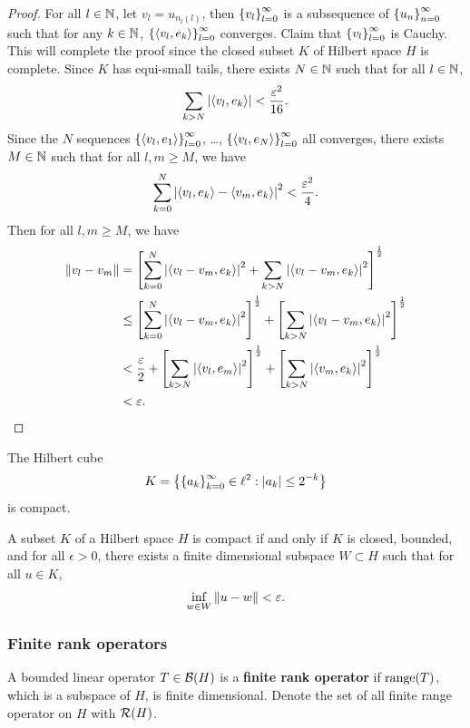 \documentclass[a4paper]{article}
\begin{document}
\begin{proof}
For all $l \in \mathbb{N}$, let $v_l = u_{n_l(l)}$, then 
$\left\{ v_l \right\}_{l=0}^\infty$ is a subsequence of $\left\{ u_n \right\}_{n=0}^\infty$
such that for any $k \in \mathbb{N}$, 
$\left\{ \left\langle v_l, e_k \right\rangle \right\}_{l=0}^\infty$ converges. Claim that 
$\left\{ v_l \right\}_{l=0}^\infty$ is Cauchy. This will complete the proof 
since the closed subset $K$ of Hilbert space $H$ is complete.
Since $K$ has equi-small tails, there exists $N \in \mathbb{N}$
such that for all $l \in \mathbb{N}$, 
\[
\sum_{k > N} \left\lvert \left\langle v_l, e_k \right\rangle\right\rvert < \frac{\varepsilon^2}{16}.
\]
Since the $N$ sequences $\left\{ \left\langle v_l, e_1 \right\rangle \right\}_{l=0}^\infty$, 
\dots, $\left\{ \left\langle v_l, e_N \right\rangle \right\}_{l=0}^\infty$ all converges, 
there exists $M \in \mathbb{N}$ such that for all $l, m \geq M$, 
we have 
\[
\sum_{k=0}^N \left\lvert \left\langle v_l, e_k \right\rangle - \left\langle v_m, e_k \right\rangle\right\rvert^2 
< \frac{\varepsilon^2}{4}.
\]
Then for all $l, m \geq M$, we have 
\[
\begin{aligned}
  \left\lVert v_l - v_m\right\rVert 
  &= 
  \left[ \sum_{k=0}^N \left\lvert \left\langle v_l - v_m, e_k \right\rangle\right\rvert^2 
  + \sum_{k > N} \left\lvert \left\langle v_l - v_m, e_k \right\rangle\right\rvert^2 \right]^{\frac{1}{2}} \\
  &\leq
  \left[ \sum_{k=0}^N \left\lvert \left\langle v_l - v_m, e_k \right\rangle\right\rvert^2  \right]
  ^{\frac{1}{2}}
  + \left[ \sum_{k > N} \left\lvert \left\langle v_l - v_m, e_k \right\rangle\right\rvert^2 \right]
  ^{\frac{1}{2}} \\ 
  &< \frac{\varepsilon}{2} + \left[ \sum_{k > N} \left\lvert \left\langle v_l, e_m \right\rangle\right\rvert^2 \right]
  ^{\frac{1}{2}} + \left[ \sum_{k > N} \left\lvert \left\langle v_m, e_k \right\rangle\right\rvert^2 \right]
  ^{\frac{1}{2}} \\
  &< \varepsilon. 
\end{aligned}
\]
\end{proof}

\begin{eg}
The Hilbert cube 
\[
K = \left\{ \left\{ a_k \right\}_{k=0}^\infty \in \ell^2 : \left\lvert a_k\right\rvert \leq 2^{-k} \right\}
\]
is compact.
\end{eg}

\begin{thm}
A subset $K$ of a Hilbert space $H$ is compact 
if and only if $K$ is closed, bounded, and for 
all $\epsilon > 0$, there exists a finite dimensional subspace 
$W \subset H$ such that for all $u \in K$, 
\[
\inf_{w \in W} \left\lVert u - w\right\rVert < \varepsilon.
\] 
\end{thm}

\subsubsection*{Finite rank operators}

\begin{defi}
A bounded linear operator $T \in \mathcal{B}(H)$ is a \textbf{finite 
rank operator} if $\operatorname{range}(T)$, which is a subspace of $H$,
is finite dimensional. Denote the set of all finite range 
operator on $H$ with $\mathcal{R} (H)$.
\end{defi}
\end{document}
